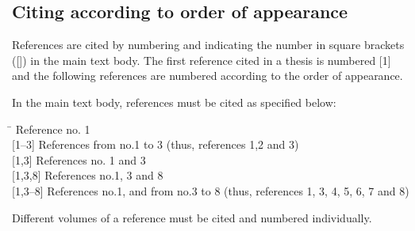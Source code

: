 \subsection{Citing according to order of appearance}

References are cited by numbering and indicating the number in square brackets ([]) in the main text body. The first reference cited in a thesis is numbered [1] and the following references are numbered according to the order of appearance. 

In the main text body, references must be cited as specified below:
\vspace*{-12pt}
\begin{tabbing}
\hspace*{1.5cm}\= \kill
[1]      \> Reference no. 1\\

[1--3]   \> References from no.1 to 3 (thus, references 1,2 and 3)\\

[1,3]    \> References no. 1 and 3\\

[1,3,8]  \> References no.1, 3 and 8\\

[1,3--8] \> References no.1, and from no.3 to 8 (thus, references 1, 3, 4, 5, 6, 7 and 8)
\end{tabbing}
\vspace*{-12pt}
Different volumes of a reference must be cited and numbered individually.